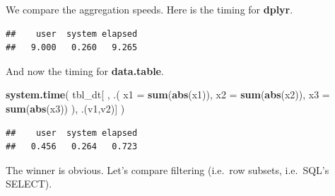 \documentclass[]{book}
\newenvironment{Shaded}{\begin{snugshade}}{\end{snugshade}}
\newcommand{\KeywordTok}[1]{\textcolor[rgb]{0.13,0.29,0.53}{\textbf{#1}}}
\newcommand{\DataTypeTok}[1]{\textcolor[rgb]{0.13,0.29,0.53}{#1}}
\newcommand{\StringTok}[1]{\textcolor[rgb]{0.31,0.60,0.02}{#1}}
\newcommand{\OperatorTok}[1]{\textcolor[rgb]{0.81,0.36,0.00}{\textbf{#1}}}
\newcommand{\NormalTok}[1]{#1}
\theoremstyle{definition}
\theoremstyle{definition}
\theoremstyle{definition}
\theoremstyle{remark}
\begin{document}
We compare the aggregation speeds. Here is the timing for
\textbf{dplyr}.

\begin{Shaded}
\end{Shaded}

\begin{verbatim}
##    user  system elapsed 
##   9.000   0.260   9.265
\end{verbatim}

And now the timing for \textbf{data.table}.

\begin{Shaded}
\begin{Highlighting}[]
\KeywordTok{system.time}\NormalTok{( }
\NormalTok{  tbl_dt[ ,  .( }\DataTypeTok{x1 =} \KeywordTok{sum}\NormalTok{(}\KeywordTok{abs}\NormalTok{(x1)), }\DataTypeTok{x2 =} \KeywordTok{sum}\NormalTok{(}\KeywordTok{abs}\NormalTok{(x2)), }\DataTypeTok{x3 =} \KeywordTok{sum}\NormalTok{(}\KeywordTok{abs}\NormalTok{(x3)) ), .(v1,v2)]}
\NormalTok{  )}
\end{Highlighting}
\end{Shaded}

\begin{verbatim}
##    user  system elapsed 
##   0.456   0.264   0.723
\end{verbatim}

The winner is obvious. Let's compare filtering (i.e.~row subsets,
i.e.~SQL's SELECT).

\begin{Shaded}
\end{Shaded}
\end{document}
